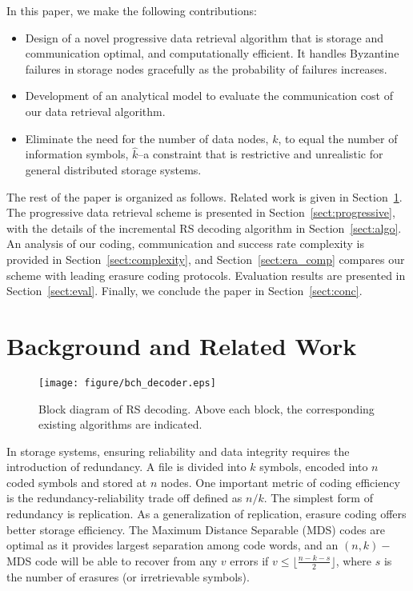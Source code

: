 \documentclass[10pt,journal,letterpaper,compsoc]{IEEEtran}
\newcommand{\0}{{\bf 0}}
\begin{document}
In this paper, we make the following contributions:
\begin{itemize}
\item Design of a novel progressive data retrieval algorithm that is storage
and communication optimal, and computationally efficient. It handles Byzantine
failures in storage nodes gracefully as the probability of failures increases.
\item Development of an analytical model to evaluate the communication cost of
our data retrieval algorithm.
\item Eliminate the need for the number of data nodes, $k$, to equal the number of
information symbols, $\hat{k}$--a constraint that is restrictive and unrealistic
for general distributed storage systems.
\end{itemize}




The rest of the paper is organized as follows. Related work is given in
Section~\ref{sect:related}. The progressive data retrieval scheme is presented
in Section~\ref{sect:progressive}, with the details of the incremental RS
decoding algorithm in Section~\ref{sect:algo}.  An analysis of our coding,
communication and success rate complexity is provided in
Section~\ref{sect:complexity}, and Section~\ref{sect:era_comp} compares our scheme with leading erasure coding protocols. Evaluation results are presented in
Section~\ref{sect:eval}.  Finally, we
conclude the paper in Section~\ref{sect:conc}.
\section{Background and Related Work}
\label{sect:related}
\begin{figure*}[thp]
\begin{center}
\texttt{[image: figure/bch\_decoder.eps]}
\caption{Block diagram of RS decoding. Above each block, the corresponding existing algorithms are indicated.}
\label{fig:rs_decode}
\end{center}
\end{figure*}
In storage systems, ensuring reliability and data integrity requires the introduction of
redundancy. A file is divided into $k$ symbols, encoded into $n$ coded  symbols and
stored at $n$ nodes. One important metric of coding efficiency is the
redundancy-reliability trade off defined as $n/k$. The simplest form of redundancy
is replication.  As a generalization of replication, erasure coding offers
better storage efficiency. The Maximum Distance Separable (MDS) codes are
optimal as it provides largest separation among code words, and an $(n, k)-$MDS
code will be able to recover from any $v$ errors if 
$v \le \lfloor{\frac{n-k-s}{2}}\rfloor$,
where $s$ is the number of erasures (or irretrievable symbols).
\end{document}
